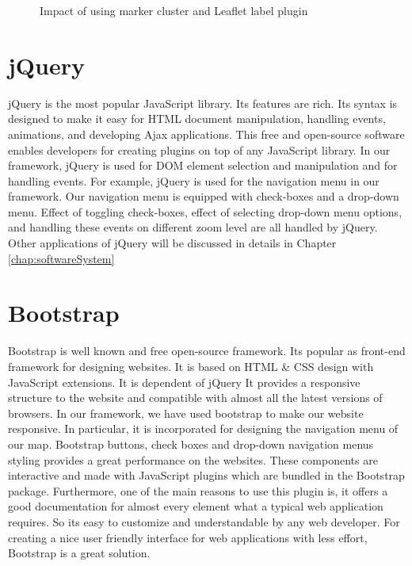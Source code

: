 \begin{figure}[H]
  \begin{center}
\hfill
{}
\hfill
\caption{Impact of using marker cluster and Leaflet label plugin}
\end{center}
\end{figure}

\section*{jQuery}

jQuery is the most popular JavaScript library. Its features are rich. Its syntax is designed to make it easy for HTML document manipulation, handling events, animations, and developing Ajax applications. This free and open-source software enables developers for creating plugins on top of any JavaScript library. In our framework, jQuery is used for DOM element selection and manipulation and for handling events. For example, jQuery is used for the navigation menu in our framework. Our navigation menu is equipped with check-boxes and a drop-down menu. Effect of toggling check-boxes, effect of selecting drop-down menu options, and handling these events on different zoom level are all handled by jQuery. Other applications of jQuery will be discussed in details in Chapter \ref{chap:softwareSystem}  

\section*{Bootstrap}

Bootstrap is well known and free open-source framework. Its popular as front-end framework for designing websites. It is based on HTML \& CSS design with JavaScript extensions. It is dependent of jQuery It provides a responsive structure to the website and compatible with almost all the latest versions of browsers. In our framework, we have used bootstrap to make our website responsive. In particular, it is incorporated for designing the navigation menu of our map.
Bootstrap buttons, check boxes and drop-down navigation menus styling provides a great performance on the websites. These components are interactive and made with JavaScript plugins which are bundled in the Bootstrap package. Furthermore, one of the main reasons to use this plugin is, it offers a good documentation for almost every element what a typical web application requires. So its easy to customize and understandable by any web developer. For creating a nice user friendly interface for web applications with less effort, Bootstrap is a great solution.


